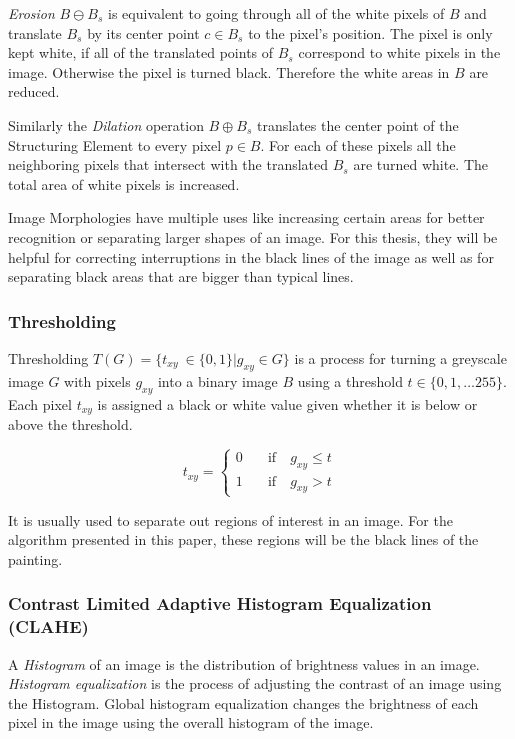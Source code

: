 \documentclass[serif,article,noparskip]{agse-thesis}
\begin{document}
\textit{Erosion} $B \ominus B_s$ is equivalent to going through all of the white
pixels of $B$ and translate $B_s$ by its center point $c \in B_s$ to the pixel's
position. The pixel is only kept white, if all of the translated points of $B_s$
correspond to white pixels in the image. Otherwise the pixel is turned black. Therefore
the white areas in $B$ are reduced. \cite{Smith1997}

Similarly the \textit{Dilation} operation  $B \oplus B_s$ translates the center
point of the Structuring Element to every pixel $p \in B$. For each of these
pixels all the neighboring pixels that intersect with the translated $B_s$ are
turned white. The total area of white pixels is increased. \cite{Smith1997}

Image Morphologies have multiple uses like increasing certain areas for better
recognition or separating larger shapes of an image. For this thesis, they will
be helpful for correcting interruptions in the black lines of the image as well
as for separating black areas that are bigger than typical lines.

\subsubsection{Thresholding}

Thresholding $T(G) = \{t_{xy}\ \in \{0,1\} | g_{xy} \in G\}$ is a process for turning a greyscale image $G$
with pixels $g_{xy}$ into a binary image $B$ using a threshold $t \in \{
0,1,\dots255\}$. Each pixel $t_{xy}$ is assigned a black or white value given
whether it is below or above the threshold.

\begin{equation}
  t_{xy} =
  \begin{cases}
    0 & \quad  \text{if}  \quad g_{xy} \leq t\\
    1  & \quad \text{if}  \quad g_{xy} > t
  \end{cases}
\end{equation}

It is usually used to separate out regions of interest in an image. For the
algorithm presented in this paper, these regions will be the black lines of the
painting.

\subsubsection{Contrast Limited Adaptive Histogram
Equalization (CLAHE)} \label{clahe}

A \textit{Histogram} of an image is the distribution of brightness values in an
image. \textit{Histogram equalization} is the process of adjusting the contrast
of an image using the Histogram. Global histogram equalization changes the
brightness of each pixel in the image using the overall histogram of the image.
\cite{ShapiroLindaG2001Cv}
\end{document}
